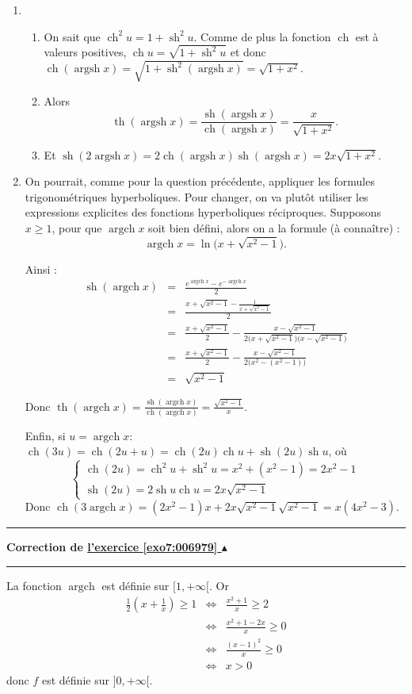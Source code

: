 \documentclass[11pt,a4paper]{article}
\renewcommand{\ge}{\geqslant} \renewcommand{\geq}{\geqslant}
\newcommand{\ch}{\mathop{\mathrm{ch}}\nolimits}
\newcommand{\sh}{\mathop{\mathrm{sh}}\nolimits}
\renewcommand{\tanh}{\mathop{\mathrm{th}}\nolimits}
\newcommand{\Argsh}{\mathop{\mathrm{argsh}}\nolimits}
\newcommand{\Argch}{\mathop{\mathrm{argch}}\nolimits}
\newcounter{exo}
\newcommand{\correction}[1]{\hypertarget{cor7:#1}{}\label{cor7:#1}{\bf Correction de \hyperlink{exo7:#1}{l'exercice \ref{exo7:#1} $\blacktriangle$}}\vspace{1mm}\hrule\vspace{1mm}}
\newcommand{\fincorrection}{\vspace{1mm}\hrule\vspace*{7mm}}
\begin{document}
\begin{enumerate}
  \item 
  \begin{enumerate}
    \item On sait que $\ch^2 u=1+\sh^2u$. Comme de plus la fonction $\ch$ est à valeurs positives, 
$\ch u=\sqrt{1+\sh^2u}$ et donc $\ch(\Argsh x)=\sqrt{1+\sh^2(\Argsh x)} = \sqrt{1+x^2}$. 

    \item Alors
$$\tanh(\Argsh x)=\frac{\sh(\Argsh x)}{\ch(\Argsh x)}=\frac{x}{\sqrt{1+x^2}}.$$

    \item Et $\sh(2\Argsh x)=2\ch(\Argsh x)\sh(\Argsh x)=2x\sqrt{1+x^2}$.
  \end{enumerate}
  
\item On pourrait, comme pour la question précédente, appliquer les formules 
trigonométriques hyperboliques. Pour changer, on va plutôt utiliser les expressions explicites 
des fonctions hyperboliques réciproques. Supposons $x\ge 1$, pour que $\Argch x$ 
soit bien défini, alors on a la formule (à connaître) :
$$\Argch x=\ln\big(x+\sqrt{x^2-1}\big).$$ 

Ainsi :
\begin{eqnarray*}
\sh(\Argch x)&=&\frac{e^{\Argch x}-e^{-\Argch x}}{2}\\
 &=& \frac{x+\sqrt{x^2-1}-\frac{1}{x+\sqrt{x^2-1}}}{2}\\
 &=& \frac{x+\sqrt{x^2-1}}{2}-\frac{x-\sqrt{x^2-1}}{2\big(x+\sqrt{x^2-1}\big)\big(x-\sqrt{x^2-1}\big)}\\
 &=& \frac{x+\sqrt{x^2-1}}{2}-\frac{x-\sqrt{x^2-1}}{2\big(x^2-(x^2-1)\big)}\\
 &=& \sqrt{x^2-1}
\end{eqnarray*}

\medskip

Donc $\displaystyle\tanh(\Argch x)=\frac{\sh(\Argch x)}{\ch(\Argch x)}=\frac{\sqrt{x^2-1}}{x}$. 

\medskip

Enfin, si $u=\Argch x$:
$\ch(3u)=\ch(2u+u)=\ch(2u)\ch u+\sh(2u)\sh u$, où 
$$\left\{\begin{array}{l}
\ch(2u)=\ch^2u+\sh^2u=x^2+(x^2-1)=2x^2-1\\
\sh(2u)=2\sh u\ch u=2x\sqrt{x^2-1}
\end{array}\right.$$ 
Donc 
$\ch(3\Argch x)=(2x^2-1)x+2x\sqrt{x^2-1}\sqrt{x^2-1}=x(4x^2-3)$. 
\end{enumerate}
\fincorrection
\correction{006979}
La fonction $\Argch$ est définie sur $[1,+\infty[$. Or
\begin{eqnarray*}
\frac{1}{2}\left(x+\frac{1}{x}\right)\ge 1
 &\Longleftrightarrow&\frac{x^2+1}{x}\ge 2\\
 &\Longleftrightarrow&\frac{x^2+1-2x}{x}\ge 0\\
 &\Longleftrightarrow&\frac{(x-1)^2}{x}\ge 0\\
 &\Longleftrightarrow& x > 0 
\end{eqnarray*}
donc $f$ est définie sur $]0,+\infty[$. 
\end{document}
